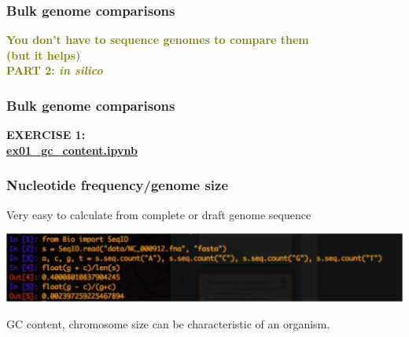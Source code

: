 
%
\begin{frame}
  \frametitle{Bulk genome comparisons}
  \Large{
    \textcolor{olive}{
      \textbf{
      You don't have to sequence genomes to compare them \\
      (but it helps) \\
      PART 2: \textit{in silico}
      }
    }
  }
\end{frame}

%
\begin{frame}
  \frametitle{Bulk genome comparisons}
  \Large{
    \textcolor{hutton_blue}{
      \textbf{
      EXERCISE 1: \\
      \url{ex01_gc_content.ipynb}
      }
    }
  }
\end{frame}

%
\begin{frame}
  \frametitle{Nucleotide frequency/genome size}
  Very easy to calculate from complete or draft genome sequence \\
  \begin{center}
    \includegraphics[width=\textwidth]{images/python_gc} \\
  \end{center}  
  GC content, chromosome size can be characteristic of an organism.
\end{frame}

